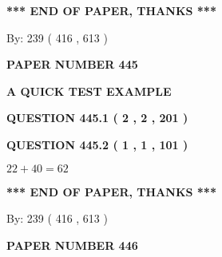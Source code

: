 \documentclass[12pt]{article}
\begin{document}
   
   
   
   
\vspace{1.0in} 
{\textbf{\large{ *** END OF PAPER, THANKS *** }}} 
   
   
\hspace{1.0in} By: 
 239 ( 416 ,  613 )
   
   
   
   
\newpage 
\setcounter{page}{ 
   445001 } 
   
   
   
   
 {\textbf{ \Large{ PAPER NUMBER  445  }}}
   
   
\vspace{0.2in}
   
   
   
   
   
   
 \vspace{0.2in}
{\LARGE {\textbf{ A QUICK TEST EXAMPLE}}}
   
   
  
\vspace{0.2in}
  
{\textbf{\Large{QUESTION
445.1 
 ( 2 , 2 , 201 )
}}}
  
  
  
\vspace{0.2in}
  
{\textbf{\Large{QUESTION
445.2 
 ( 1 , 1 , 101 )
}}}
  
  
 
 

$ %
22 +  %
40=   %
62$
 
 
   
   
 \vspace{0.2in}
 
   
   
   
   
\vspace{1.0in} 
{\textbf{\large{ *** END OF PAPER, THANKS *** }}} 
   
   
\hspace{1.0in} By: 
 239 ( 416 ,  613 )
   
   
   
   
\newpage 
\setcounter{page}{ 
   446001 } 
   
   
   
   
 {\textbf{ \Large{ PAPER NUMBER  446  }}}
   
\end{document}
